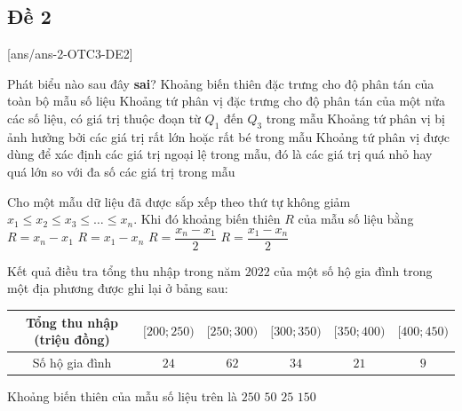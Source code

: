 \subsection{Đề 2}
[ans/ans-2-OTC3-DE2]
\caulc
\begin{ex}%
	Phát biểu nào sau đây \textbf{sai}?
	\choice
	{Khoảng biến thiên đặc trưng cho độ phân tán của toàn bộ mẫu số liệu}
	{Khoảng tứ phân vị đặc trưng cho độ phân tán của một nửa các số liệu, có giá trị thuộc đoạn từ $Q_1$ đến $Q_3$ trong mẫu}
	{\True Khoảng tứ phân vị bị ảnh hưởng bởi các giá trị rất lớn hoặc rất bé trong mẫu}
	{Khoảng tứ phân vị được dùng để xác định các giá trị ngoại lệ trong mẫu, đó là các giá trị quá nhỏ hay quá lớn so với đa số các giá trị trong mẫu}
	\loigiai{}
\end{ex}
\begin{ex}%
	Cho một mẫu dữ liệu đã được sắp xếp theo thứ tự không giảm $x_1 \leq x_2 \leq x_3 \leq \ldots \leq x_n$. Khi đó khoảng biến thiên $R$ của mẫu số liệu bằng
	\choice
	{\True $R=x_n-x_1$}
	{$R=x_1-x_n$}
	{$R=\dfrac{x_n-x_1}{2}$}
	{$R=\dfrac{x_1-x_n}{2}$}
	\loigiai{}
\end{ex}
\begin{ex}%
	Kết quả điều tra tổng thu nhập trong năm $2022$ của một số hộ gia đình trong một địa phương được ghi lại ở bảng sau:
	\begin{center}
		\begin{tabular}{|c|c|c|c|c|c|}
			\hline
			Tổng thu nhập (triệu đồng) & $[200;250)$ & $[250;300)$ & $[300;350)$ & $[350;400)$ & $[400;450)$ \\
			\hline
			Số hộ gia đình & $24$ & $62$ & $34$ & $21$ & $9$ \\
			\hline
		\end{tabular}
	\end{center}
	Khoảng biến thiên của mẫu số liệu trên là
	\choice
	{\True $250$}
	{$50$}
	{$25$}
	{$150$}
\end{ex}

